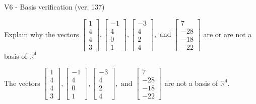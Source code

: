 \begin{exercise}
  \begin{exerciseTitle}V6 - Basis verification (ver. 137)\end{exerciseTitle}
  \begin{exerciseStatement}
    Explain why the vectors \(\left[\begin{array}{r}
1 \\
4 \\
4 \\
3
\end{array}\right] , \left[\begin{array}{r}
-1 \\
4 \\
0 \\
1
\end{array}\right] , \left[\begin{array}{r}
-3 \\
4 \\
2 \\
4
\end{array}\right] , \text{ and } \left[\begin{array}{r}
7 \\
-28 \\
-18 \\
-22
\end{array}\right]\) are or are not a basis of \(\mathbb{R}^4\)	


  \end{exerciseStatement}
  \begin{exerciseAnswer}
   The vectors \(\left[\begin{array}{r}
1 \\
4 \\
4 \\
3
\end{array}\right] , \left[\begin{array}{r}
-1 \\
4 \\
0 \\
1
\end{array}\right] , \left[\begin{array}{r}
-3 \\
4 \\
2 \\
4
\end{array}\right] , \text{ and } \left[\begin{array}{r}
7 \\
-28 \\
-18 \\
-22
\end{array}\right]\) 
  	 are not  a basis of \(\mathbb{R}^4\).
  


  \end{exerciseAnswer}
\end{exercise}